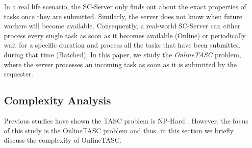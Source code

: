 In a real life scenario, the SC-Server only finds out about the exact properties of tasks once they are submitted. Similarly, the server does not know when future workers will become available. Consequently, a real-world SC-Server can either process every single task as soon as it becomes available (Online) or periodically wait for a specific duration and process all the tasks that have been submitted during that time (Batched). In this paper, we study the \textit{OnlineTASC} problem, where the server processes an incoming task as soon as it is submitted by the requester.
\vspace{-0.1in}
\subsection{Complexity Analysis}
\vspace{-0.05in}
Previous studies have shown the TASC problem is NP-Hard \cite{Deng15}. However, the focus of this study is the OnlineTASC problem and thus, in this section we briefly discuss the complexity of OnlineTASC.

